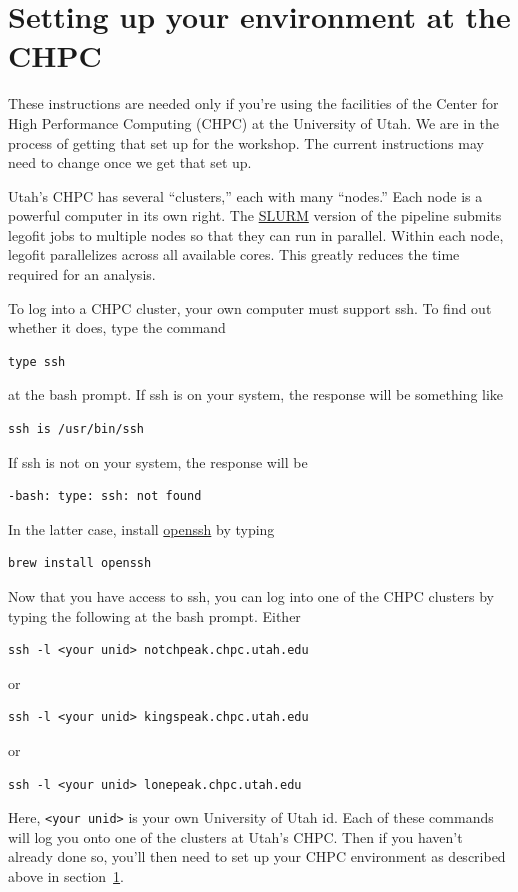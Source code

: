 \documentclass[11pt]{article}
\begin{document}
\section{Setting up your environment at the CHPC}
\label{sec.chpc}
These instructions are needed only if you're using the facilities of
the Center for High Performance Computing (CHPC) at the University of
Utah. We are in the process of getting that set up for the
workshop. The current instructions may need to change once we get that
set up.

Utah's CHPC has several ``clusters,'' each with many ``nodes.''  Each
node is a powerful computer in its own right. The
\href{https://slurm.schedmd.com/documentation.html}{SLURM} version of
the pipeline submits legofit jobs to multiple nodes so that they can
run in parallel. Within each node, legofit parallelizes across all
available cores. This greatly reduces the time required for an
analysis.

To log into a CHPC cluster, your own computer must support ssh. To
find out whether it does, type the command
\begin{verbatim}
type ssh
\end{verbatim}
at the bash prompt. If ssh is on your system, the response will be
something like
\begin{verbatim}
ssh is /usr/bin/ssh
\end{verbatim}
If ssh is not on your system, the response will be
\begin{verbatim}
-bash: type: ssh: not found
\end{verbatim}
In the latter case, install \href{https://www.openssh.com}{openssh} by
typing
\begin{verbatim}
brew install openssh
\end{verbatim}

Now that you have access to ssh, you can log into one of the CHPC
clusters by typing the following at the bash prompt. Either
\begin{verbatim}
ssh -l <your unid> notchpeak.chpc.utah.edu
\end{verbatim}
or
\begin{verbatim}
ssh -l <your unid> kingspeak.chpc.utah.edu
\end{verbatim}
or
\begin{verbatim}
ssh -l <your unid> lonepeak.chpc.utah.edu
\end{verbatim}
Here, \verb|<your unid>| is your own University of Utah id. Each of
these commands will log you onto one of the clusters at Utah's CHPC.
Then if you haven't already done so, you'll then need to set up your
CHPC environment as described above in section~\ref{sec.chpc}.
\end{document}
